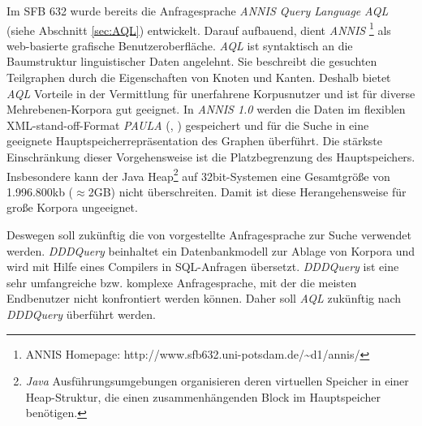 Im SFB 632 wurde bereits die Anfragesprache \emph{ANNIS Query Language} \emph{AQL} (siehe Abschnitt \ref{sec:AQL}) entwickelt. Darauf aufbauend, dient \emph{ANNIS} \citep[]{annis}\footnote{ANNIS Homepage: http://www.sfb632.uni-potsdam.de/\~{ }d1/annis/} als web-basierte grafische Benutzeroberfläche. \emph{AQL} ist syntaktisch an die Baumstruktur linguistischer Daten angelehnt. Sie beschreibt die gesuchten Teilgraphen durch die Eigenschaften von Knoten und Kanten. Deshalb bietet \emph{AQL} Vorteile in der Vermittlung für unerfahrene Korpusnutzer  und ist für diverse Mehrebenen-Korpora gut geeignet. In \emph{ANNIS 1.0} werden die Daten im flexiblen XML-stand-off-Format \emph{PAULA} (\citet[]{dipper2005paula}, \citet[]{woerner2006}) gespeichert und für die Suche in eine geeignete Hauptspeicherrepräsentation des Graphen überführt. Die stärkste Einschränkung dieser Vorgehensweise ist die Platzbegrenzung des Hauptspeichers. Insbesondere kann der Java Heap\footnote{\emph{Java} Ausführungsumgebungen organisieren deren virtuellen Speicher in einer Heap-Struktur, die einen zusammenhängenden Block im Hauptspeicher benötigen.} auf 32bit-Systemen eine Gesamtgröße von 1.996.800kb ($\approx$2GB) nicht überschreiten. Damit ist diese Herangehensweise für große Korpora ungeeignet.

Deswegen soll zukünftig die von \citet{dddquery-springer} vorgestellte Anfragesprache zur Suche verwendet werden. \emph{DDDQuery} beinhaltet ein Datenbankmodell zur Ablage von Korpora und wird mit Hilfe eines Compilers in SQL-Anfragen übersetzt. \emph{DDDQuery}  ist eine sehr umfangreiche bzw. komplexe Anfragesprache, mit der die meisten Endbenutzer nicht konfrontiert werden können. Daher soll \emph{AQL} zukünftig nach \emph{DDDQuery} überführt werden.

%
%

